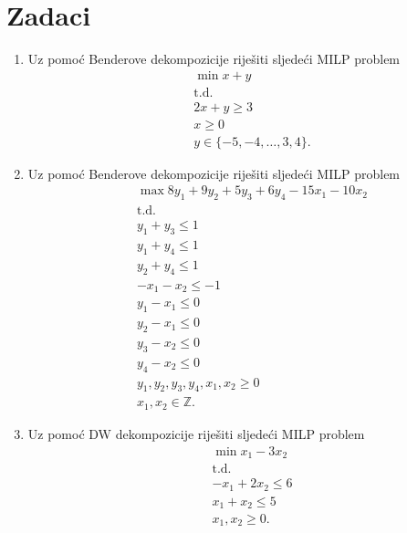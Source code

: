 \documentclass[b5paper, utf8, 11pt, colorlinks]{book}
\theoremstyle{definition}
\begin{document}
\section{Zadaci}
\begin{enumerate}
	\item %
	  	Uz pomoć Benderove dekompozicije riješiti sljedeći MILP problem
	  \begin{align*}
	  	   &\min x + y \\
	  	   &\mbox{t.d.} \\
	  	   & 2x + y \geq 3 \\
	  	   & x \geq 0 \\
	  	   & y \in \{-5, -4,\ldots, 3, 4\}.
   	  \end{align*}
	\item %
	Uz pomoć Benderove dekompozicije riješiti sljedeći MILP problem
	\begin{align*}
		 &\max 8 y_1 + 9 y_2 + 5 y_3 + 6 y_4 - 15 x_1 - 10 x_2 \\
		 &\mbox{t.d.} \\
		 &y_1 + y_3 \leq 1 \\
		 & y_1 + y_4 \leq 1 \\
		 &y_2 + y_4 \leq 1 \\
		 & -x_1-x_2 \leq -1 \\
		 & y_1 - x_1 \leq 0 \\
		 & y_2 - x_1 \leq 0 \\
		 & y_3 - x_2 \leq 0 \\
		 & y_4 - x_2 \leq 0 \\
		 & y_1,y_2,y_3,y_4,x_1, x_2 \geq 0 \\
		 & x_1, x_2 \in \mathbb{Z}.
	\end{align*}
\item %
Uz pomoć DW dekompozicije riješiti sljedeći MILP problem
\begin{align*}
	&\min x_1 - 3 x_2 \\
	&\mbox{t.d.} \\
	& -x_1 + 2x_2 \leq 6 \\
	& x_1 + x_2 \leq 5 \\
	& x_1, x_2 \geq 0.
\end{align*}


\end{enumerate}
\end{document}
